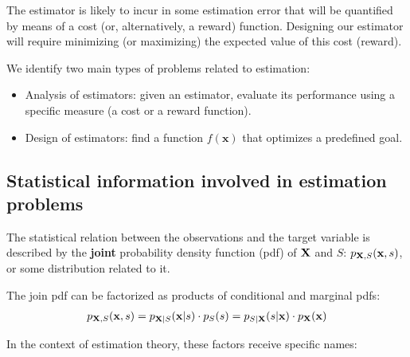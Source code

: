 The estimator is likely to incur in some estimation error that will be quantified by means of a cost (or, alternatively, a reward) function. Designing our estimator will require minimizing (or maximizing) the expected value of this cost (reward).

We identify two main types of problems related to estimation:
\begin{itemize}
\item Analysis of estimators: given an estimator, evaluate its performance using a specific measure (a cost or a reward function).
\item Design of estimators: find a function $f(\mathbf{x})$ that optimizes a predefined goal.
\end{itemize}


\subsection{Statistical information involved in estimation problems}
\label{subsec:statistical_info}

The statistical relation between the observations and the target variable is described by the {\bf joint} probability density function (pdf) of ${\bf X}$ and $S$: $p_{{\bf X},S}({\bf x},s)$, or some distribution related to it. 

The join pdf can be factorized as products of conditional and marginal pdfs:
\begin{align}
p_{{\bf X},S}({\bf x},s) = p_{{\bf X}| S}({\bf x}| s) \cdot p_S(s) 
                         = p_{S|{\bf X}}(s|{\bf x}) \cdot p_{\bf X}({\bf x}) 
\end{align}

In the context of estimation theory, these factors receive specific names:

